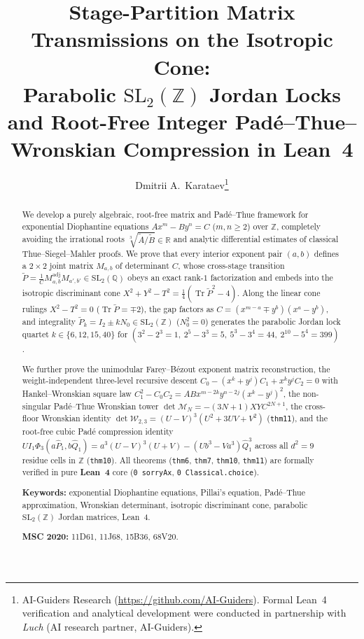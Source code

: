 \documentclass[11pt,a4paper]{article}
\title{\textbf{Stage-Partition Matrix Transmissions on the Isotropic Cone:\\ Parabolic $\mathrm{SL}_2(\mathbb{Z})$ Jordan Locks and Root-Free Integer Pad\'e--Thue--Wronskian Compression in Lean~4}}
\author{Dmitrii A.~Karataev\thanks{AI-Guiders Research (\url{https://github.com/AI-Guiders}). Formal Lean~4 verification and analytical development were conducted in partnership with \emph{Luch} (AI research partner, AI-Guiders).}}
\date{}
\theoremstyle{plain}
\theoremstyle{definition}
\begin{document}
\maketitle

\begin{abstract}
We develop a purely algebraic, root-free matrix and Pad\'e--Thue framework for exponential Diophantine equations $A x^m - B y^n = C$ ($m,n\ge 2$) over $\mathbb{Z}$, completely avoiding the irrational roots $\sqrt[3]{\widetilde{A}/\widetilde{B}}\in\mathbb{R}$ and analytic differential estimates of classical Thue--Siegel--Mahler proofs. We prove that every interior exponent pair $(a,b)$ defines a $2\times 2$ joint matrix $M_{a,b}$ of determinant $C$, whose cross-stage transition $\widetilde{P} = \frac{1}{C}M_{a,b}^{\mathrm{adj}}M_{a',b'}\in\mathrm{SL}_2(\mathbb{Q})$ obeys an exact rank-$1$ factorization and embeds into the isotropic discriminant cone $X^2 + Y^2 - T^2 = \frac{1}{4}(\operatorname{Tr}\widetilde{P}^2 - 4)$. Along the linear cone rulings $X^2 - T^2 = 0$ ($\operatorname{Tr}\widetilde{P} = \mp 2$), the gap factors as $C = (x^{m-a}\mp y^b)(x^a - y^b)$, and integrality $\widetilde{P}_k = I_2 \pm k N_0\in\mathrm{SL}_2(\mathbb{Z})$ ($N_0^2 = 0$) generates the parabolic Jordan lock quartet $k\in\{6,12,15,40\}$ for $(3^2-2^3=1,\ 2^5-3^3=5,\ 5^3-3^4=44,\ 2^{10}-5^4=399)$.

We further prove the unimodular Farey--B\'ezout exponent matrix reconstruction, the weight-independent three-level recursive descent $C_0 - (x^k+y^j)C_1 + x^k y^j C_2 = 0$ with Hankel--Wronskian square law $C_1^2 - C_0 C_2 = A B x^{m-2k}y^{n-2j}(x^k-y^j)^2$, the non-singular Pad\'e--Thue Wronskian tower $\det\mathcal{M}_N = -(3N+1)X Y C^{2N+1}$, the cross-floor Wronskian identity $\det\mathcal{W}_{2,3} = (U-V)^3(U^2+3UV+V^2)$ (\texttt{thm11}), and the root-free cubic Pad\'e compression identity $U I_1 \Phi_3(a\widehat{P}_1, b\widehat{Q}_1) = a^3(U-V)^3(U+V) - (U b^3 - V a^3)\widehat{Q}_1^3$ across all $d^2=9$ residue cells in $\mathbb{Z}$ (\texttt{thm10}). All theorems (\texttt{thm6}, \texttt{thm7}, \texttt{thm10}, \texttt{thm11}) are formally verified in pure \textbf{Lean~4} core (\texttt{0 sorryAx}, \texttt{0 Classical.choice}).

\medskip\noindent
\textbf{Keywords:} exponential Diophantine equations, Pillai's equation, Pad\'e--Thue approximation, Wronskian determinant, isotropic discriminant cone, parabolic $\mathrm{SL}_2(\mathbb{Z})$ Jordan matrices, Lean~4.

\smallskip\noindent
\textbf{MSC 2020:} 11D61, 11J68, 15B36, 68V20.
\end{abstract}
\end{document}
